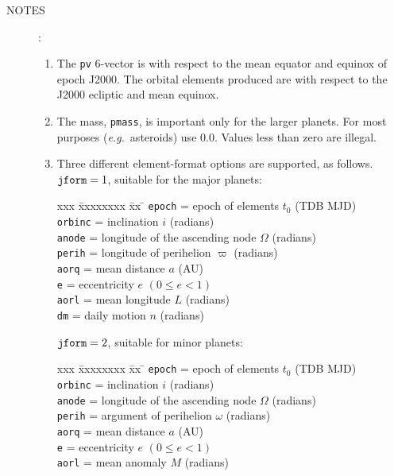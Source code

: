 \documentclass[11pt,fleqn,twoside]{article}
\renewcommand{\_}{{\tt\char'137}}     %
\newlength{\oldspacing}
\newcommand{\notes}[1]
{
  \goodbreak
  \setlength{\oldspacing}{\topsep}
  \setlength{\topsep}{0.3ex}
  \begin{description}
    \item[NOTES]:
        #1
  \end{description}
  \setlength{\topsep}{\oldspacing}
}
\begin{document}
\notes
{
 \begin{enumerate}
  \item The {\tt pv} 6-vector is with respect
        to the mean equator and equinox of
        epoch J2000.  The orbital elements produced are with respect to
        the J2000 ecliptic and mean equinox.
  \item The mass, {\tt pmass}, is important
        only for the larger planets.  For
        most purposes ({\it e.g.}~asteroids) use 0.0.
        Values less than zero are illegal.
  \item Three different element-format options are supported, as
        follows. \\
 
        ${\tt jform}=1$, suitable for the major planets:
 
        \begin{tabbing}
        xxx \= xxxxxxxx \= xx \= \kill
        \> {\tt epoch}  \> = \> epoch of elements $t_0$ (TDB MJD) \\
        \> {\tt orbinc} \> = \> inclination $i$ (radians) \\
        \> {\tt anode}  \> = \> longitude of the
                                ascending node $\Omega$ (radians) \\
        \> {\tt perih}  \> = \> longitude of perihelion
                                $\varpi$ (radians) \\
        \> {\tt aorq}   \> = \> mean distance $a$ (AU) \\
        \> {\tt e}      \> = \> eccentricity $e$ $( 0 \leq e < 1 )$ \\
        \> {\tt aorl}   \> = \> mean longitude $L$ (radians) \\
        \> {\tt dm}     \> = \> daily motion $n$ (radians)
        \end{tabbing}
 
        ${\tt jform}=2$, suitable for minor planets:
 
        \begin{tabbing}
        xxx \= xxxxxxxx \= xx \= \kill
        \> {\tt epoch}  \> = \> epoch of elements $t_0$ (TDB MJD) \\
        \> {\tt orbinc} \> = \> inclination $i$ (radians) \\
        \> {\tt anode}  \> = \> longitude of the ascending node
                                $\Omega$ (radians) \\
        \> {\tt perih}  \> = \> argument of perihelion
                                $\omega$ (radians) \\
        \> {\tt aorq}   \> = \> mean distance $a$ (AU) \\
        \> {\tt e}      \> = \> eccentricity $e$ $( 0 \leq e < 1 )$ \\
        \> {\tt aorl}   \> = \> mean anomaly $M$ (radians)
        \end{tabbing}
 

\end{enumerate}}
\end{document}
